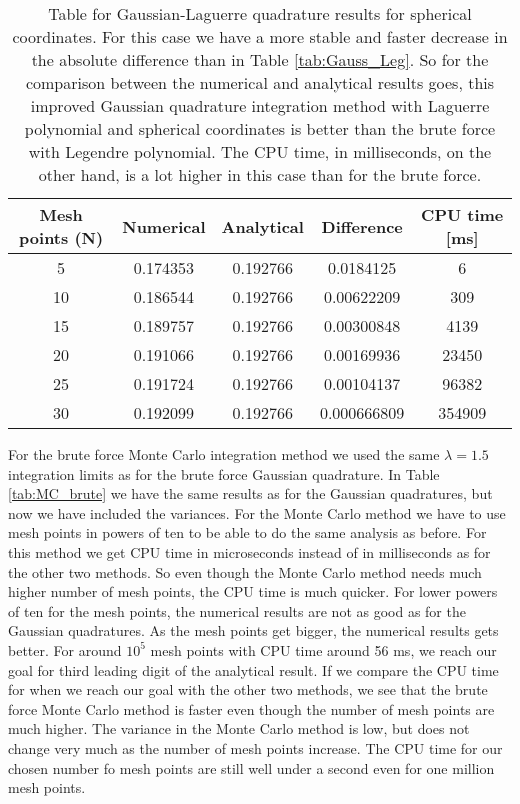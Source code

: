 \documentclass[12pt,a4paper,english]{article}
\begin{document}
\begin{table}[htbp]
	\centering
	\begin{tabular}{ |c|c|c|c|c| }
		\hline \rule{0pt}{13pt}
		Mesh points (N) & Numerical & Analytical & Difference & CPU time [ms]\\
		\hline \rule{0pt}{13pt}
		5 & 0.174353 & 0.192766 & 0.0184125 & 6 \\
		\hline \rule{0pt}{13pt}
		10 & 0.186544 & 0.192766 & 0.00622209 & 309 \\
		\hline \rule{0pt}{13pt}
		15 & 0.189757 & 0.192766 & 0.00300848 & 4139 \\
		\hline \rule{0pt}{13pt}
		20 & 0.191066 & 0.192766 & 0.00169936 & 23450 \\
		\hline \rule{0pt}{13pt}
		25 & 0.191724 & 0.192766 & 0.00104137 & 96382 \\
		\hline \rule{0pt}{13pt}
		30 & 0.192099 & 0.192766 & 0.000666809 & 354909 \\
		\hline 
	\end{tabular}
	\caption{Table for Gaussian-Laguerre quadrature results for spherical coordinates. For this case we have a more stable and faster decrease in the absolute difference than in Table \ref{tab:Gauss_Leg}. So for the comparison between the numerical and analytical results goes, this improved Gaussian quadrature integration method with Laguerre polynomial and spherical coordinates is better than the brute force with Legendre polynomial. The CPU time, in milliseconds, on the other hand, is a lot higher in this case than for the brute force.}
	\label{tab:Gauss_Lag}
\end{table}

For the brute force Monte Carlo integration method we used the same $\lambda=1.5$ integration limits as for the brute force Gaussian quadrature. In Table \ref{tab:MC_brute} we have the same results as for the Gaussian quadratures, but now we have included the variances. For the Monte Carlo method we have to use mesh points in powers of ten to be able to do the same analysis as before. For this method we get CPU time in microseconds instead of in milliseconds as for the other two methods. So even though the Monte Carlo method needs much higher number of mesh points, the CPU time is much quicker. For lower powers of ten for the mesh points, the numerical results are not as good as for the Gaussian quadratures. As the mesh points get bigger, the numerical results gets better. For around $10^5$ mesh points with CPU time around 56 ms, we reach our goal for third leading digit of the analytical result. If we compare the CPU time for when we reach our goal with the other two methods, we see that the brute force Monte Carlo method is faster even though the number of mesh points are much higher. The variance in the Monte Carlo method is low, but does not change very much as the number of mesh points increase. The CPU time for our chosen number fo mesh points are still well under a second even for one million mesh points.
\end{document}
